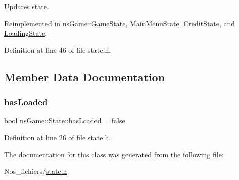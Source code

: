 Updates state. 



Reimplemented in \hyperlink{classns_game_1_1_game_state_a4d3cb871a1aec541a37fe241664b738c}{ns\+Game\+::\+Game\+State}, \hyperlink{class_main_menu_state_a7846cc7f1bd9b1fc40d77cc8f7644e03}{Main\+Menu\+State}, \hyperlink{class_credit_state_a52a92d650fce22fa08b37359c3a5aa64}{Credit\+State}, and \hyperlink{class_loading_state_a2c84aeaac65724696a6cacd6474119bf}{Loading\+State}.



Definition at line 46 of file state.\+h.



\subsection{Member Data Documentation}
\mbox{\label{structns_game_1_1_state_a5e7566cb6bba78e6a01d4fc5f568ec5d}} 
\subsubsection{\texorpdfstring{has\+Loaded}{hasLoaded}}
{\footnotesize\ttfamily bool ns\+Game\+::\+State\+::has\+Loaded = false}



Definition at line 26 of file state.\+h.



The documentation for this class was generated from the following file\+:\begin{DoxyCompactItemize}
\item 
Nos\+\_\+fichiers/\hyperlink{state_8h}{state.\+h}\end{DoxyCompactItemize}
